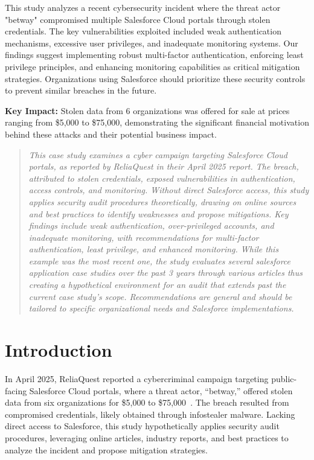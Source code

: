 \documentclass[12pt,a4paper]{article}
\begin{document}
\tableofcontents
\clearpage

\begin{summary}
This study analyzes a recent cybersecurity incident where the threat actor "betway" compromised multiple Salesforce Cloud portals through stolen credentials. The key vulnerabilities exploited included weak authentication mechanisms, excessive user privileges, and inadequate monitoring systems. Our findings suggest implementing robust multi-factor authentication, enforcing least privilege principles, and enhancing monitoring capabilities as critical mitigation strategies. Organizations using Salesforce should prioritize these security controls to prevent similar breaches in the future.

\vspace{0.5em}
\textbf{Key Impact:} Stolen data from 6 organizations was offered for sale at prices ranging from \$5,000 to \$75,000, demonstrating the significant financial motivation behind these attacks and their potential business impact.
\end{summary}
\vspace{1cm}

\begin{abstract}
\textit{This case study examines a cyber campaign targeting Salesforce Cloud portals, as reported by ReliaQuest in their April 2025 report. The breach, attributed to stolen credentials, exposed vulnerabilities in authentication, access controls, and monitoring. Without direct Salesforce access, this study applies security audit procedures theoretically, drawing on online sources and best practices to identify weaknesses and propose mitigations. Key findings include weak authentication, over-privileged accounts, and inadequate monitoring, with recommendations for multi-factor authentication, least privilege, and enhanced monitoring. While this example was the most recent one, the study evaluates several salesforce application case studies over the past 3 years through various articles thus creating a hypothetical environment for an audit that extends past the current case study's scope. Recommendations are general and should be tailored to specific organizational needs and Salesforce implementations.}
\end{abstract}

\section{Introduction}
In April 2025, ReliaQuest reported a cybercriminal campaign targeting public-facing Salesforce Cloud portals, where a threat actor, ``betway,'' offered stolen data from six organizations for \$5,000 to \$75,000~\cite{reliaquest2025}. The breach resulted from compromised credentials, likely obtained through infostealer malware. Lacking direct access to Salesforce, this study hypothetically applies security audit procedures, leveraging online articles, industry reports, and best practices to analyze the incident and propose mitigation strategies.
\end{document}
